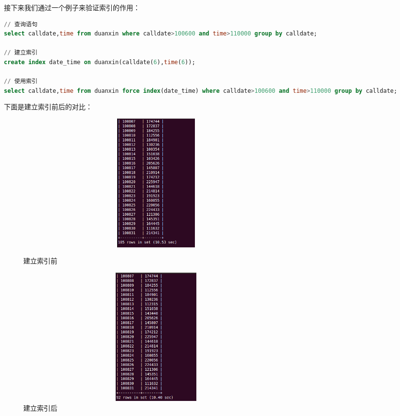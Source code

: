 接下来我们通过一个例子来验证索引的作用：

\begin{lstlisting}[language=SQL]
// 查询语句 
select calldate,time from duanxin where calldate>100600 and time>110000 group by calldate;

// 建立索引 
create index date_time on duanxin(calldate(6),time(6));

// 使用索引 
select calldate,time from duanxin force index(date_time) where calldate>100600 and time>110000 group by calldate;
\end{lstlisting}

下面是建立索引前后的对比：
\begin{figure}[h]
\begin{minipage}[t]{0.4\linewidth}
\centering
\includegraphics[width=0.7\textwidth,height=7cm]{photo/index1.png}
\caption{建立索引前}
\end{minipage}
\hfill
\begin{minipage}[t]{0.4\linewidth}
\centering
\includegraphics[width=0.7\textwidth,height=7cm]{photo/index2.png}
\caption{建立索引后}
\end{minipage}
\end{figure}

